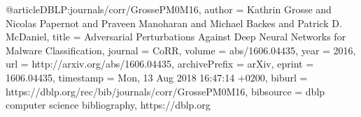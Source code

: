 @article{DBLP:journals/corr/GrossePM0M16,
  author    = {Kathrin Grosse and
               Nicolas Papernot and
               Praveen Manoharan and
               Michael Backes and
               Patrick D. McDaniel},
  title     = {Adversarial Perturbations Against Deep Neural Networks for Malware
               Classification},
  journal   = {CoRR},
  volume    = {abs/1606.04435},
  year      = {2016},
  url       = {http://arxiv.org/abs/1606.04435},
  archivePrefix = {arXiv},
  eprint    = {1606.04435},
  timestamp = {Mon, 13 Aug 2018 16:47:14 +0200},
  biburl    = {https://dblp.org/rec/bib/journals/corr/GrossePM0M16},
  bibsource = {dblp computer science bibliography, https://dblp.org}
}